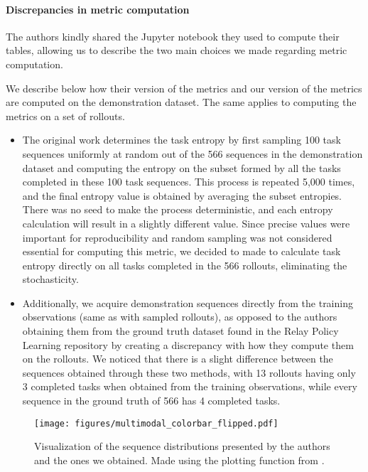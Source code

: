 \paragraph{Discrepancies in metric computation}

The authors kindly shared the Jupyter notebook they used to compute their tables, allowing us to describe the two main choices we made regarding metric computation.

We describe below how their version of the metrics and our version of the metrics are computed on the demonstration dataset.
The same applies to computing the metrics on a set of rollouts.

\begin{itemize}
    \item The original work determines the task entropy by first sampling 100 task sequences uniformly at random out of the 566 sequences in the demonstration dataset and computing the entropy on the subset formed by all the tasks completed in these 100 task sequences.
    This process is repeated 5,000 times, and the final entropy value is obtained by averaging the subset entropies.
    There was no seed to make the process deterministic, and each entropy calculation will result in a slightly different value.
    Since precise values were important for reproducibility and random sampling was not considered essential for computing this metric, we decided to made to calculate task entropy directly on all tasks completed in the 566 rollouts, eliminating the stochasticity.
    \item Additionally, we acquire demonstration sequences directly from the training observations (same as with sampled rollouts), as opposed to the authors obtaining them from the ground truth dataset found in the Relay Policy Learning repository by \cite{gupta_relay_2019} creating a discrepancy with how they compute them on the rollouts.
    We noticed that there is a slight difference between the sequences obtained through these two methods, with 13 rollouts having only 3 completed tasks when obtained from the training observations, while every sequence in the ground truth of 566 has 4 completed tasks.

\end{itemize}

\begin{figure}[htb]
\texttt{[image: figures/multimodal\_colorbar\_flipped.pdf]}
\centering
\caption{Visualization of the sequence distributions presented by the authors and the ones we obtained. Made using the plotting function from \citet{shafiullah2022behavior}. }
\label{fig:multimodal_distr}
\end{figure}


